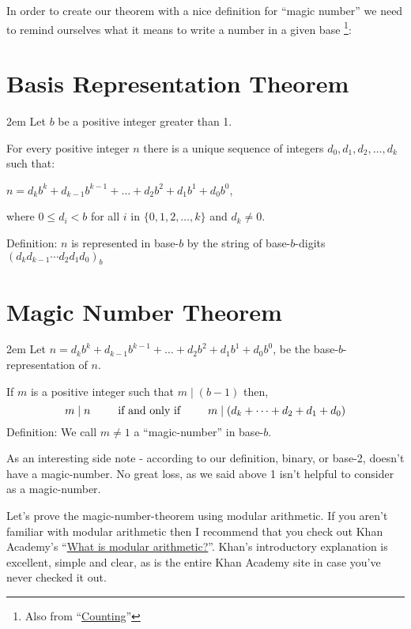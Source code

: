 \documentclass{article}
\newenvironment{jprIn}{\begin{adjustwidth}{2em}{}}{\end{adjustwidth}}
\begin{document}
In order to create our theorem with a 
nice definition for ``magic number''
we need to remind ourselves 
what it means to write a number in a given base
\footnote{Also from ``\href {https://dl.dropboxusercontent.com/u/2157321/basisReprThm.pdf} {Counting}''}:

\section*{Basis Representation Theorem}
\begin{jprIn}
Let $b$ be a positive integer greater than 1.

For every positive integer $n$ there is a unique sequence
of integers $d_0, d_1, d_2,\dots{},d_k$ such that:

\hspace{3em}$n=d_kb^k+d_{k-1}b^{k-1}+\dots+d_2b^2+d_1b^1+d_0b^0$,

where $0\le{}d_i<b$ for all $i$ in $\{0,1,2,\dots{},k\}$ and $d_k\ne0$.

Definition: $n$ is represented in base-$b$ by the string
of base-$b$-digits $(d_kd_{k-1}{\cdots}d_2d_1d_0)_b$
\end{jprIn}
%
\section*{Magic Number Theorem}
\begin{jprIn}
Let
$n=d_kb^k+d_{k-1}b^{k-1}+\dots+d_2b^2+d_1b^1+d_0b^0$,
be the base-$b$-representation of $n$.

If $m$ is a positive integer such that $m\mid{}(b-1)$ then,
\[m\mid{}n \text{\hspace{2.5em}if and only if\hspace{2.5em}}m\mid{}(d_k+\dots+d_2+d_1+d_0)\]
Definition: We call $m\ne1$ a ``magic-number'' in base-$b$.
\end{jprIn}
\bigskip

As an interesting side note - according to our definition, binary,
or base-2, doesn't have a magic-number.
No great loss, as we said above 1 isn't helpful to consider as a magic-number. 

Let's prove the magic-number-theorem using 
modular arithmetic. If you aren't familiar with modular arithmetic
then I recommend that you check out Khan Academy's
``\href{https://www.khanacademy.org/computing/computer-science/cryptography/modarithmetic/a/what-is-modular-arithmetic}{What is modular arithmetic?}''.
Khan's introductory explanation is excellent, simple and clear,
as is the entire Khan Academy site in case you've never checked it out.
\end{document}
